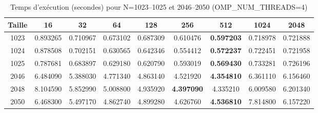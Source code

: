 \documentclass[a4paper,13pt]{book}
\begin{document}
\begin{table}[ht]
    \centering
    \caption{Temps d'exécution (secondes) pour N=1023--1025 et 2046--2050 (OMP\_NUM\_THREADS=4)}
    \label{tab:threads4}
    \begin{tabular}{|c|c|c|c|c|c|c|c|c|}\hline
    Taille & 16 & 32 & 64 & 128 & 256 & 512 & 1024 & 2048 \\\hline
    1023 & 0.893265 & 0.710967 & 0.673102 & 0.687309 & 0.610476 & \textbf{0.597203} & 0.718978 & 0.721888 \\\hline
    1024 & 0.878508 & 0.702151 & 0.630565 & 0.642346 & 0.554412 & \textbf{0.572237} & 0.722451 & 0.721958 \\\hline
    1025 & 0.787681 & 0.683897 & 0.629180 & 0.620790 & 0.593019 & \textbf{0.569430} & 0.733281 & 0.726196 \\\hline
    2046 & 6.484090 & 5.388030 & 4.771340 & 4.863140 & 4.521920 & \textbf{4.354810} & 6.361110 & 6.156460 \\\hline
    2048 & 8.104590 & 5.852990 & 5.008800 & 4.935920 & \textbf{4.397090} & 4.335210 & 6.009580 & 6.201340 \\\hline
    2050 & 6.468300 & 5.497170 & 4.862740 & 4.899280 & 4.626760 & \textbf{4.536810} & 7.814800 & 6.157220 \\\hline
    \end{tabular}
\end{table}
\end{document}
